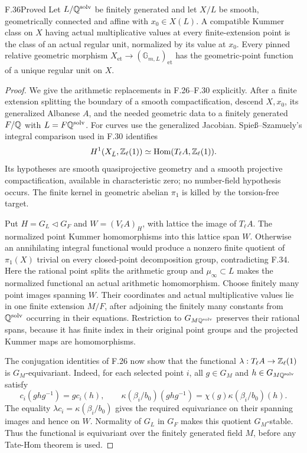 \begin{claim}{F.36}{Proved}
Let $L/\mathbb Q^{\mathrm{solv}}$ be finitely generated and let $X/L$
be smooth, geometrically connected and affine with $x_0\in X(L)$.
A compatible Kummer class on $X$ having actual multiplicative
values at every finite-extension point is the class of an actual
regular unit, normalized by its value at $x_0$.
Every pinned relative geometric morphism
$X_{\mathrm{et}}\to(\mathbb G_{m,L})_{\mathrm{et}}$ has the
geometric-point function of a unique regular unit on $X$.
\end{claim}
\begin{proof}
We give the arithmetic replacements in F.26--F.30 explicitly.
After a finite extension splitting the boundary of a smooth
compactification, descend $X,x_0$, its generalized Albanese $A$,
and the needed geometric data to a finitely generated $F/\mathbb Q$
with $L=F\mathbb Q^{\mathrm{solv}}$. For curves use the generalized
Jacobian. Spie\ss--Szamuely's integral comparison used in F.30
identifies
\[
 H^1(X_{\bar L},\mathbb Z_\ell(1))
   \simeq\operatorname{Hom}(T_\ell A,\mathbb Z_\ell(1)).
\]
Its hypotheses are smooth quasiprojective geometry and a smooth
projective compactification, available in characteristic zero;
no number-field hypothesis occurs. The finite kernel in geometric
abelian $\pi_1$ is killed by the torsion-free target.

Put $H=G_L\triangleleft G_F$ and
$W=(V_\ell A)_H$, with lattice the image of $T_\ell A$.
The normalized point Kummer homomorphisms into this lattice
span $W$. Otherwise an annihilating integral functional would
produce a nonzero finite quotient of $\pi_1(X)$ trivial on
every closed-point decomposition group, contradicting F.34.
Here the rational point splits the arithmetic group and
$\mu_\infty\subset L$ makes the normalized functional an
actual arithmetic homomorphism. Choose finitely many point
images spanning $W$. Their coordinates and actual multiplicative
values lie in one finite extension $M/F$, after adjoining the
finitely many constants from $\mathbb Q^{\mathrm{solv}}$ occurring
in their equations. Restriction to
$G_{M\mathbb Q^{\mathrm{solv}}}$ preserves their rational spans,
because it has finite index in their original point groups and
the projected Kummer maps are homomorphisms.

The conjugation identities of F.26 now show that the functional
$\lambda:T_\ell A\to\mathbb Z_\ell(1)$ is $G_M$-equivariant.
Indeed, for each selected point $i$, all
$g\in G_M$ and $h\in G_{M\mathbb Q^{\mathrm{solv}}}$ satisfy
\[
 c_i(ghg^{-1})=g c_i(h),\qquad
 \kappa(\beta_i/b_0)(ghg^{-1})
       =\chi(g)\kappa(\beta_i/b_0)(h).
\]
The equality $\lambda c_i=\kappa(\beta_i/b_0)$ gives the
required equivariance on their spanning images and hence on
$W$. Normality of $G_L$ in $G_F$ makes this quotient
$G_M$-stable. Thus the functional is equivariant over the
finitely generated field $M$, before any Tate-Hom theorem is used.


\end{proof}
